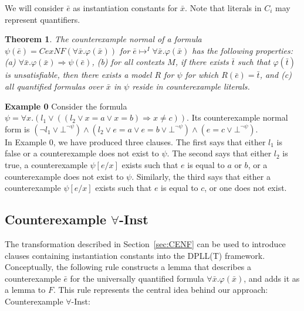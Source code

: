 \documentclass{llncs}
\newtheorem{thm}{Theorem}
\begin{document}
We will consider $\bar{e}$ as instantiation constants for $\bar{x}$.
Note that literals in $C_i$ may represent quantifiers.

\begin{thm}
The counterexample normal of a formula $\psi( \bar{e} ) = CexNF( \forall \bar{x}. \varphi( \bar{ x } ) )$ for $\bar{e} \mapsto^I \forall \bar{x}. \varphi( \bar{ x } )$ has the following properties:
(a) $\forall \bar{x}. \varphi( \bar{ x } ) \Rightarrow \psi( \bar{e} )$,
(b) for all contexts $M$, if there exists $\bar{t}$ such that $\varphi( \bar{t} )$ is unsatisfiable, then there exists a model $R$ for $\psi$ for which $R( \bar{e} ) = \bar{t}$, and
(c) all quantified formulas over $\bar{x}$ in $\psi$ reside in counterexample literals. \\
\end{thm}

{\bf Example 0}
Consider the formula $\psi = \forall x. (l_1 \vee (( l_2 \vee x = a \vee x = b ) \Rightarrow x \neq c))$.
Its counterexample normal form is $( \neg l_1 \vee \bot^{\neg \psi}) \wedge ( l_2 \vee e = a \vee e = b \vee \bot^{\neg \psi} ) \wedge ( e = c \vee \bot^{\neg \psi})$. \\

In Example 0, we have produced three clauses.
The first says that either $l_1$ is false or a counterexample does not exist to $\psi$.
The second says that either $l_2$ is true, a counterexample $\psi[e/x]$ exists such that $e$ is equal to $a$ or $b$, or a counterexample does not exist to $\psi$. 
Similarly, the third says that either a counterexample $\psi[e/x]$ exists such that $e$ is equal to $c$, or one does not exist.

\subsection{Counterexample $\forall$-Inst}

The transformation described in Section~\ref{sec:CENF} can be used to introduce clauses containing instantiation constants into the DPLL(T) framework.
Conceptually, the following rule constructs a lemma that describes a counterexample $\bar{e}$ for the universally quantified formula $\forall \bar{x}. \varphi( \bar{ x } )$, and adds it as a lemma to $F$.
This rule represents the central idea behind our approach: \\

\noindent Counterexample $\forall$-Inst: \\
\end{document}
